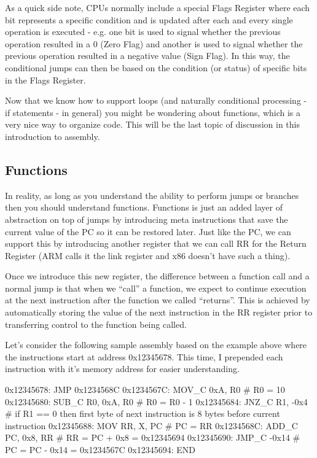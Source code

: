 As a quick side note, CPUs normally include a special Flags Register where each bit represents a specific condition and is updated after each and every single operation is executed - e.g. one bit is used to signal whether the previous operation resulted in a 0 (Zero Flag) and another is used to signal whether the previous operation resulted in a negative value (Sign Flag). In this way, the conditional jumps can then be based on the condition (or status) of specific bits in the Flags Register. 

Now that we know how to support loops (and naturally conditional processing - if statements - in general) you might be wondering about functions, which is a very nice way to organize code. This will be the last topic of discussion in this introduction to assembly.

\subsection{Functions}

In reality, as long as you understand the ability to perform jumps or branches then you should understand functions. Functions is just an added layer of abstraction on top of jumps by introducing meta instructions that save the current value of the PC so it can be restored later. Just like the PC, we can support this by introducing another register that we can call RR for the Return Register (ARM calls it the link register and x86 doesn’t have such a thing).

Once we introduce this new register, the difference between a function call and a normal jump is that when we “call” a function, we expect to continue execution at the next instruction after the function we called “returns”. This is achieved by automatically storing the value of the next instruction in the RR register prior to transferring control to the function being called.

Let’s consider the following sample assembly based on the example above where the instructions start at address 0x12345678. This time, I prepended each instruction with it’s memory address for easier understanding.

\begin{code}
0x12345678:	JMP 0x1234568C
0x1234567C:	MOV_C 0xA, R0 # R0 = 10
0x12345680:	SUB_C R0, 0xA, R0 # R0 = R0 - 1
0x12345684:	JNZ_C R1, -0x4 # if R1 == 0 then first byte of next instruction is 8 bytes before current instruction
0x12345688:	MOV RR, X, PC # PC = RR
0x1234568C:	ADD_C PC, 0x8, RR # RR = PC + 0x8 = 0x12345694
0x12345690:	JMP_C -0x14 # PC = PC - 0x14 = 0x1234567C
0x12345694:	END
\end{code}

